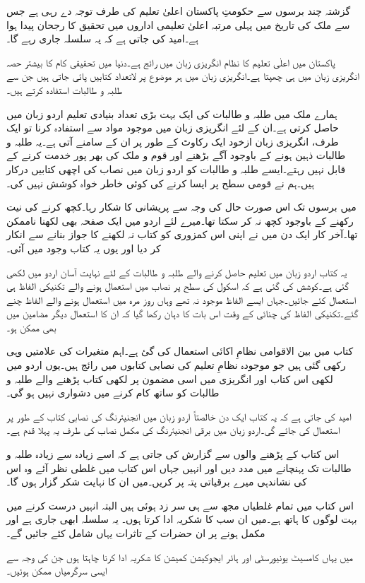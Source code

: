 گزشتہ چند برسوں سے حکومتِ پاکستان اعلیٰ تعلیم کی طرف توجہ دے رہی ہے جس سے ملک کی تاریخ میں پہلی مرتبہ اعلیٰ تعلیمی اداروں میں تحقیق کا رجحان پیدا ہوا ہے۔امید کی جاتی ہے کہ یہ سلسلہ جاری رہے گا۔

پاکستان میں اعلٰی تعلیم کا نظام انگریزی زبان میں رائج ہے۔دنیا میں تحقیقی کام کا بیشتر حصہ انگریزی زبان میں ہی چھپتا ہے۔انگریزی زبان میں ہر موضوع پر لاتعداد کتابیں پائی جاتی ہیں جن سے طلبہ و طالبات استفادہ  کرتے ہیں۔

ہمارے ملک میں طلبہ و طالبات کی ایک بہت بڑی تعداد بنیادی تعلیم اردو زبان میں حاصل کرتی ہے۔ان کے لئے انگریزی زبان میں موجود مواد سے استفادہ  کرنا تو ایک طرف، انگریزی زبان ازخود ایک رکاوٹ کے طور پر ان کے سامنے آتی ہے۔یہ طلبہ و طالبات ذہین ہونے کے باوجود آگے بڑھنے اور قوم و ملک کی بھر پور خدمت کرنے کے قابل نہیں رہتے۔ایسے طلبہ و طالبات کو اردو زبان میں نصاب کی اچھی کتابیں درکار ہیں۔ہم نے قومی سطح پر ایسا کرنے کی کوئی خاطر خواہ کوشش نہیں کی۔ 

میں برسوں تک اس صورت حال کی وجہ سے پریشانی کا شکار رہا۔کچھ کرنے کی نیت رکھنے کے باوجود کچھ نہ کر سکتا تھا۔میرے لئے اردو میں ایک صفحہ بھی لکھنا ناممکن تھا۔آخر کار ایک دن میں نے اپنی اس کمزوری کو کتاب نہ لکھنے کا جواز بنانے سے انکار کر دیا اور یوں یہ کتاب وجود میں آئی۔

یہ کتاب اردو زبان میں تعلیم حاصل کرنے والے طلبہ و طالبات کے لئے نہایت آسان اردو میں لکھی گئی ہے۔کوشش کی گئی ہے کہ اسکول کی سطح پر نصاب میں استعمال ہونے والے تکنیکی الفاظ ہی استعمال کئے جائیں۔جہاں ایسے الفاظ موجود نہ تھے وہاں روز مرہ میں استعمال ہونے والے الفاظ چنے گئے۔تکنیکی الفاظ کی چنائی کے وقت اس بات کا دہان رکھا گیا کہ ان کا استعمال دیگر مضامین میں بھی ممکن ہو۔

کتاب میں بین الاقوامی نظامِ اکائی استعمال کی گئ ہے۔اہم متغیرات کی علامتیں وہی رکھی گئی ہیں جو موجودہ نظامِ تعلیم کی نصابی کتابوں میں رائج ہیں۔یوں اردو میں لکھی اس کتاب اور انگریزی میں اسی مضمون پر لکھی کتاب پڑھنے والے طلبہ و طالبات کو ساتھ کام کرنے میں دشواری نہیں ہو گی۔ 

امید کی جاتی ہے کہ یہ کتاب ایک دن خالصتاً اردو زبان میں انجنیئرنگ کی نصابی کتاب کے طور پر استعمال کی جائے گی۔اردو زبان میں برقی انجنیئرنگ کی مکمل نصاب کی طرف یہ پہلا قدم ہے۔ 

اس کتاب کے پڑھنے والوں سے گزارش کی جاتی ہے کہ اسے زیادہ سے زیادہ طلبہ و طالبات تک پہنچانے میں مدد دیں اور انہیں جہاں اس کتاب میں غلطی نظر آئے وہ اس کی نشاندہی میرے برقیاتی پتہ  پر کریں۔میں ان کا نہایت شکر گزار ہوں گا۔

اس کتاب میں تمام غلطیاں مجھ سے ہی سر زد ہوئی ہیں البتہ انہیں درست کرنے میں بہت لوگوں کا ہاتھ ہے۔میں ان سب کا شکریہ ادا کرتا ہوں۔ یہ سلسلہ ابھی جاری ہے اور مکمل ہونے پر ان حضرات کے تاثرات یہاں شامل کئے جائیں گے۔  

میں یہاں کامسیٹ یونیورسٹی اور ہائر ایجوکیشن کمیشن کا شکریہ ادا کرنا چاہتا ہوں جن کی وجہ سے ایسی سرگرمیاں ممکن ہوئیں۔	
\vspace{5mm}

{}
